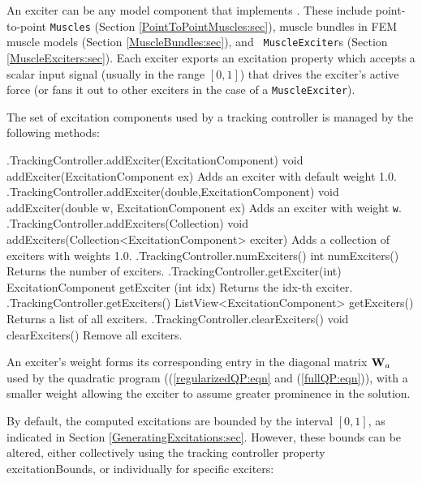 An exciter can be any model component that implements
. These include
point-to-point {\tt Muscles} (Section \ref{PointToPointMuscles:sec}), muscle
bundles in FEM muscle models (Section \ref{MuscleBundles:sec}), and {\tt
MuscleExciter}s (Section \ref{MuscleExciters:sec}). Each exciter exports an
{\sf excitation} property which accepts a scalar input signal (usually in the
range $[0,1]$) that drives the exciter's active force (or fans it out to other
exciters in the case of a {\tt MuscleExciter}).

The set of excitation components used by a tracking controller is managed by
the following methods:

%
\begin{methodtable}{0.58}{0.42}
\midline
%
\methodentry
{\inverse.TrackingController.addExciter(ExcitationComponent)}%
{void addExciter(ExcitationComponent ex)}%
{Adds an exciter with default weight 1.0.}%
%
\methodentry
{\inverse.TrackingController.addExciter(double,ExcitationComponent)}%
{void addExciter(double w, ExcitationComponent ex)}%
{Adds an exciter with weight {\tt w}.}%
%
\methodentry
{\inverse.TrackingController.addExciters(Collection)}%
{void addExciters(Collection<ExcitationComponent> exciter)}%
{Adds a collection of exciters with weights 1.0.}%
%
\methodentry
{\inverse.TrackingController.numExciters()}%
{int numExciters()}%
{Returns the number of exciters.}%
%
\methodentry
{\inverse.TrackingController.getExciter(int)}%
{ExcitationComponent getExciter (int idx)}%
{Returns the idx-th exciter.}%
%
\methodentry
{\inverse.TrackingController.getExciters()}%
{ListView<ExcitationComponent> getExciters()}%
{Returns a list of all exciters.}%
%
\methodentry
{\inverse.TrackingController.clearExciters()}%
{void clearExciters()}%
{Remove all exciters.}%
%
\midline
\end{methodtable}
%

An exciter's weight forms its corresponding entry in the diagonal matrix ${\bf W}_a$
used by the quadratic program ((\ref{regularizedQP:eqn} and
(\ref{fullQP:eqn})), with a smaller weight allowing the exciter to assume
greater prominence in the solution.

By default, the computed excitations are bounded by the interval $[0,1]$, as
indicated in Section \ref{GeneratingExcitations:sec}. However, these bounds can
be altered, either collectively using the tracking controller property {\sf
excitationBounds}, or individually for specific exciters:

